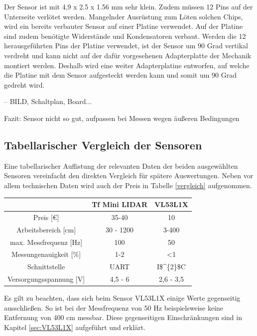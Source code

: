 Der Sensor ist mit 4,9 x 2.5 x 1.56 mm sehr klein. Zudem müssen 12 Pins auf der Unterseite verlötet werden. Mangelnder Ausrüstung zum Löten solchen Chips, wird ein bereits verbauter Sensor auf einer Platine verwendet. Auf der Platine sind zudem benötigte Widerstände und Kondensatoren verbaut. Werden die 12 herausgeführten Pins der Platine verwendet, ist der Sensor um 90 Grad vertikal verdreht und kann nicht auf der dafür vorgesehenen Adapterplatte der Mechanik montiert werden. Deshalb wird eine weiter Adapterplatine entworfen, auf welche die Platine mit dem Sensor aufgesteckt werden kann und somit um 90 Grad gedreht wird.



-- BILD, Schaltplan, Board...


Fazit: Sensor nicht so gut, aufpassen bei Messen wegen äußeren Bedingungen



\subsection{Tabellarischer Vergleich der Sensoren}

Eine tabellarischer Auflistung der relevanten Daten der beiden ausgewählten Sensoren vereinfacht den direkten Vergleich für spätere Auswertungen. Neben vor allem technischen Daten wird auch der Preis in Tabelle \ref{vergleich} aufgenommen.

\begin{center}
	\begin{tabular} [H] {|c|c|c|}
		\hline
		\textbf{} 				& \textbf{Tf Mini LIDAR}	& \textbf{VL53L1X} 	 \\ \hline
		Preis [€]				&  35-40					& 10			\\ \hline
		Arbeitsbereich [cm]		&  30 - 1200   				& 3-400			\\ \hline
		max. Messfrequenz [Hz]	&  100						& 50 			\\ \hline
		Messungenauigkeit [\%]	&  1-2 						& <1			\\ \hline
		Schnittstelle 			&  \ac{UART}				& \ac{I$^{2}$C}\\ \hline
		Versorgungsspannung [V] &  4,5 - 6 					& 2,6 - 3,5		\\ \hline
		
		\end {tabular}
		\label{vergleich}
	\end{center}

Es gilt zu beachten, dass sich beim Sensor VL53L1X einige Werte gegenseitig ausschließen. So ist bei der Messfrequenz von 50 Hz beispielsweise keine Entfernung von 400 cm messbar. Diese gegenseitigen Einschränkungen sind in Kapitel \ref{sec:VL53L1X} aufgeführt und erklärt.

